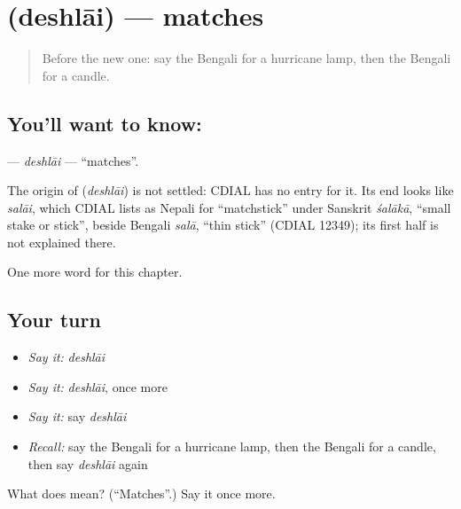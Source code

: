 \section[\texorpdfstring{\bn{দেশলাই} (deshlāi)}{দেশলাই (deshlāi)}]{ (deshlāi) — matches}

\label{lesson:BN-C110-deshlai}



\begin{quote}
Before the new one: say the Bengali for a hurricane lamp, then the Bengali for a candle.
\end{quote}

\subsection*{You'll want to know: }
\textbf{} — \emph{deshlāi} — \textquotedblleft{}matches\textquotedblright{}.

\begin{cousinweb}
The origin of \textbf{} (\emph{deshlāi}) is not settled: CDIAL has no entry for it. Its end looks like \emph{salāi}, which CDIAL lists as Nepali for \textquotedblleft{}matchstick\textquotedblright{} under Sanskrit \emph{śalākā}, \textquotedblleft{}small stake or stick\textquotedblright{}, beside Bengali \emph{salā}, \textquotedblleft{}thin stick\textquotedblright{} (CDIAL 12349); its first half is not explained there.
\end{cousinweb}

\begin{grammarlens}[title={What you've built}]
One more word for this chapter.
\end{grammarlens}

\subsection*{Your turn}
\begin{itemize}
\raggedright
  \item \emph{Say it:} \emph{deshlāi}
  \item \emph{Say it:} \emph{deshlāi}, once more
  \item \emph{Say it:} say \emph{deshlāi}
  \item \emph{Recall:} say the Bengali for a hurricane lamp, then the Bengali for a candle, then say \emph{deshlāi} again
\end{itemize}

\begin{tcolorbox}[breakable,colback=teal!4,colframe=teal!35!black,title={Before you move on}]
What does  mean? (\textquotedblleft{}Matches\textquotedblright{}.) Say it once more.
\end{tcolorbox}
